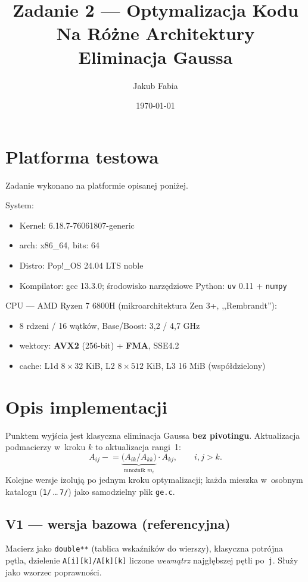 \documentclass[11pt,a4paper]{article}
\title{Zadanie 2 --- Optymalizacja Kodu Na Różne Architektury\\
\large Eliminacja Gaussa}
\author{Jakub Fabia}
\date{\today}
\begin{document}
\maketitle

\section{Platforma testowa}

Zadanie wykonano na platformie opisanej poniżej.

System:
\begin{itemize}
\item   Kernel: 6.18.7-76061807-generic
\item   arch: x86\_64, bits: 64
\item   Distro: Pop!\_OS 24.04 LTS noble
\item   Kompilator: gcc 13.3.0; środowisko narzędziowe Python: \texttt{uv} 0.11 + \texttt{numpy}
\end{itemize}

CPU --- AMD Ryzen 7 6800H (mikroarchitektura Zen 3+, ,,Rembrandt''):
\begin{itemize}
\item   8 rdzeni / 16 wątków, Base/Boost: 3{,}2 / 4{,}7 GHz
\item   wektory: \textbf{AVX2} (256-bit) + \textbf{FMA}, SSE4.2
\item   cache: L1d $8\times32$ KiB, L2 $8\times512$ KiB, L3 16 MiB (współdzielony)
\end{itemize}

\section{Opis implementacji}

Punktem wyjścia jest klasyczna eliminacja Gaussa \textbf{bez pivotingu}.
Aktualizacja podmacierzy w~kroku $k$ to aktualizacja rangi~1:
\[
A_{ij} \mathrel{-}= \underbrace{\bigl(A_{ik}/A_{kk}\bigr)}_{\text{mnożnik } m_i}\cdot A_{kj},
\qquad i,j > k .
\]
Kolejne wersje izolują po jednym kroku optymalizacji; każda mieszka w~osobnym katalogu
(\texttt{1/}\,\ldots\,\texttt{7/}) jako samodzielny plik \texttt{ge.c}.

\subsection{V1 --- wersja bazowa (referencyjna)}
Macierz jako \texttt{double**} (tablica wskaźników do wierszy), klasyczna potrójna pętla,
dzielenie \texttt{A[i][k]/A[k][k]} liczone \emph{wewnątrz} najgłębszej pętli po~\texttt{j}. Służy jako wzorzec poprawności.
\end{document}
